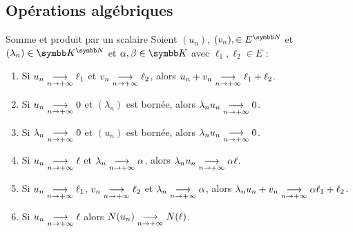 \subsection{Opérations algébriques}
\begin{proposition}{Somme et produit par un scalaire}{}
    Soient $(u_n)$, $(v_n), \in E^{\N}$ et $(\lambda_n) \in \K^{\N}$ 
    et $\alpha, \beta \in \K$ avec $\ell_1, \ell_2 \in E$ :

    \begin{enumerate}
        \item Si $u_n \underset{n \to +\infty}{\longrightarrow} \ell_1$ et $v_n \underset{n \to +\infty}{\longrightarrow} \ell_2$, alors 
            $u_n + v_n \underset{n \to +\infty}{\longrightarrow} \ell_1 + \ell_2$.
        \item Si $u_n \underset{n \to +\infty}{\longrightarrow} 0$ et $(\lambda_n)$ est bornée,
            alors $\lambda_n u_n \underset{n \to +\infty}{\longrightarrow} 0$.
        \item Si $\lambda_n \underset{n \to +\infty}{\longrightarrow} 0$ et $(u_n)$ est bornée, 
            alors $\lambda_n u_n \underset{n \to +\infty}{\longrightarrow} 0$.
        \item Si $u_n \underset{n \to +\infty}{\longrightarrow} \ell$ et $\lambda_n \underset{n \to +\infty}{\longrightarrow} \alpha$, alors
            $\lambda_n u_n \underset{n \to +\infty}{\longrightarrow} \alpha \ell$.
        \item Si $u_n \underset{n \to +\infty}{\longrightarrow} \ell_1$, $v_n \underset{n \to +\infty}{\longrightarrow} \ell_2$ 
            et $\lambda_n \underset{n \to +\infty}{\longrightarrow} \alpha$, alors
            $\lambda_n u_n + v_n \underset{n \to +\infty}{\longrightarrow} \alpha \ell_1 + \ell_2$.
        \item Si $u_n \underset{n \to +\infty}{\longrightarrow} \ell$ alors $N(u_n) \underset{n \to +\infty}{\longrightarrow} N(\ell)$.
    \end{enumerate}
\end{proposition}



